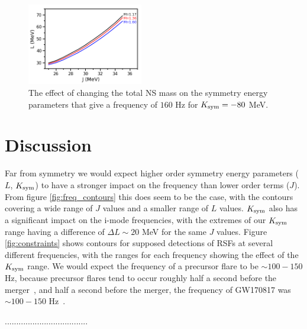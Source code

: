 \documentclass[fleqn,usenatbib]{mnras}
\begin{document}
\begin{figure}
\centering
\includegraphics[width=0.45\textwidth,angle=0]{Mcomp_f160_30_50_-80.png}
\caption{The effect of changing the total NS mass on the symmetry energy parameters that give a frequency of $160$ Hz for $K_{\rm sym}=-80$ MeV.}
\label{fig:vary_mass_contours}
\end{figure}







\section{Discussion}
\hspace{\parindent}Far from symmetry we would expect higher order symmetry energy parameters ($L$, $K_{\rm sym}$) to have a stronger impact on the frequency than lower order terms ($J$). From figure \ref{fig:freq_contours} this does seem to be the case, with the contours covering a wide range of $J$ values and a smaller range of $L$ values. $K_{\rm sym}$ also has a significant impact on the i-mode frequencies, with the extremes of our $K_{\rm sym}$ range having a difference of $\Delta L\sim 20$ MeV for the same $J$ values. Figure \ref{fig:constraints} shows contours for supposed detections of RSFs at several different frequencies, with the ranges for each frequency showing the effect of the $K_{\rm sym}$ range. We would expect the frequency of a precursor flare to be $\sim 100-150$ Hz, because precursor flares tend to occur roughly half a second before the merger~\citet{zhong2019precursors}, and half a second before the merger, the frequency of GW170817 was $\sim 100-150$ Hz~\citet{abbott2017merger}.

\hspace{\parindent}....................................
\end{document}
